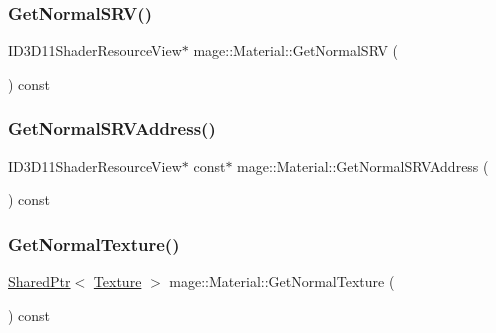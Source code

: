 \hypertarget{structmage_1_1_material_a0be98911c56dedaa4fd2f8714fc8a793}{}\label{structmage_1_1_material_a0be98911c56dedaa4fd2f8714fc8a793} 
\subsubsection{\texorpdfstring{Get\+Normal\+S\+R\+V()}{GetNormalSRV()}}
{\footnotesize\ttfamily I\+D3\+D11\+Shader\+Resource\+View$\ast$ mage\+::\+Material\+::\+Get\+Normal\+S\+RV (\begin{DoxyParamCaption}{ }\end{DoxyParamCaption}) const\hspace{0.3cm}{\ttfamily [noexcept]}}

\hypertarget{structmage_1_1_material_a297911bb366b1cc1b28d0c35353eb806}{}\label{structmage_1_1_material_a297911bb366b1cc1b28d0c35353eb806} 
\subsubsection{\texorpdfstring{Get\+Normal\+S\+R\+V\+Address()}{GetNormalSRVAddress()}}
{\footnotesize\ttfamily I\+D3\+D11\+Shader\+Resource\+View$\ast$ const$\ast$ mage\+::\+Material\+::\+Get\+Normal\+S\+R\+V\+Address (\begin{DoxyParamCaption}{ }\end{DoxyParamCaption}) const\hspace{0.3cm}{\ttfamily [noexcept]}}

\hypertarget{structmage_1_1_material_a7343766b10456e4ed1e09b3fe6110981}{}\label{structmage_1_1_material_a7343766b10456e4ed1e09b3fe6110981} 
\subsubsection{\texorpdfstring{Get\+Normal\+Texture()}{GetNormalTexture()}}
{\footnotesize\ttfamily \hyperlink{namespacemage_a1e01ae66713838a7a67d30e44c67703e}{Shared\+Ptr}$<$ \hyperlink{classmage_1_1_texture}{Texture} $>$ mage\+::\+Material\+::\+Get\+Normal\+Texture (\begin{DoxyParamCaption}{ }\end{DoxyParamCaption}) const\hspace{0.3cm}{\ttfamily [noexcept]}}

